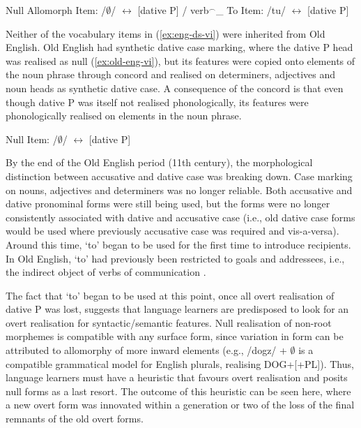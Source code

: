 	\begin{exe}
		\ex \label{ex:eng-ds-vi}
		\begin{xlist}
			\ex Null Allomorph Item: /$\emptyset$/ $\leftrightarrow$ [dative P] / verb$^{\smallfrown}$\_
			\ex To Item: /tu/ $\leftrightarrow$ [dative P]
		\end{xlist}
	\end{exe}


	Neither of the vocabulary items in (\ref{ex:eng-ds-vi}) were inherited from Old English. Old English had synthetic dative case marking, where the dative P head was realised as null (\ref{ex:old-eng-vi}), but its features were copied onto elements of the noun phrase through concord and realised on determiners, adjectives and noun heads as synthetic dative case. A consequence of the concord is that even though dative P was itself not realised phonologically, its features were phonologically realised on elements in the noun phrase. 
	
	\begin{exe}
		\ex \label{ex:old-eng-vi}
		\begin{xlist}
			\ex Null Item:  /$\emptyset$/ $\leftrightarrow$ [dative P]
		\end{xlist}
	\end{exe}
	
	By the end of the Old English period (11th century), the morphological distinction between accusative and dative case was breaking down. Case marking on nouns, adjectives and determiners was no longer reliable. Both accusative and dative pronominal forms were still being used, but the forms were no longer consistently associated with dative and accusative case (i.e., old dative case forms would be used where previously accusative case was required and vis-a-versa). Around this time, `to' began to be used for the first time to introduce recipients. In Old English, `to' had previously been restricted to goals and addressees, i.e., the indirect object of verbs of communication \citep{Allen.1999,McFadden.2002,OED.2013}. 
	
	The fact that `to' began to be used at this point, once all overt realisation of dative P was lost, suggests that language learners are predisposed to look for an overt realisation for syntactic/semantic features. Null realisation of non-root morphemes is compatible with any surface form, since variation in form can be attributed to allomorphy of more inward elements (e.g., /dogz/ + $\emptyset$ is a compatible grammatical model for English plurals, realising DOG+[+PL]). Thus, language learners must have a heuristic that favours overt realisation and posits null forms as a last resort. The outcome of this heuristic can be seen here, where a new overt form was innovated within a generation or two of the loss of the final remnants of the old overt forms. 

